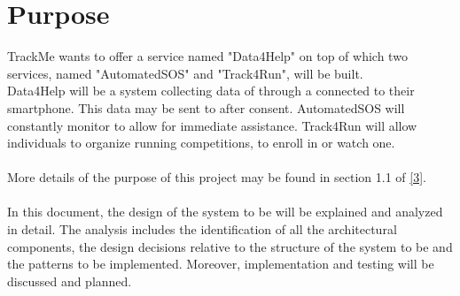 \documentclass[../../DD.tex]{subfiles}
\begin{document}
\section{Purpose}

	TrackMe wants to offer a service named "Data4Help" on top of which two services, named "AutomatedSOS" and "Track4Run", will be built.
	\\Data4Help will be a system collecting data of  through a  connected to their smartphone. This data may be sent to  after  consent.
	AutomatedSOS will constantly monitor  to allow for immediate assistance.
	Track4Run will allow individuals to organize running competitions, to enroll in or watch one.\\\\
	More details of the purpose of this project may be found in section 1.1 of \hyperref[ref:3]{[3]}.\\\\
	In this document, the design of the system to be will be explained and analyzed in detail. The analysis includes the identification of all the architectural components, the design decisions relative to the structure of the system to be and the patterns to be implemented. Moreover, implementation and testing will be discussed and planned.\\
\end{document}
